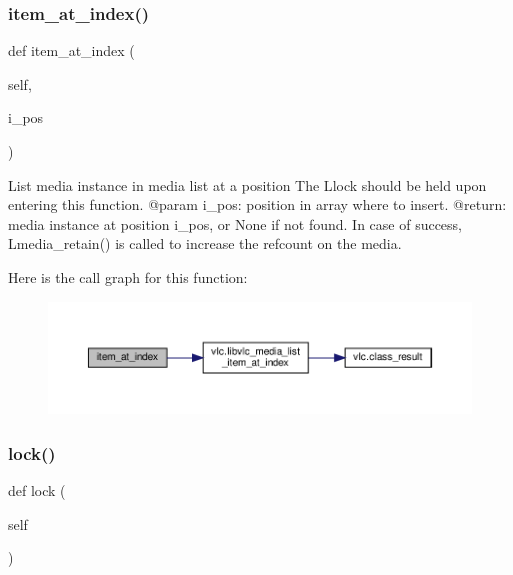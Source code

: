 \subsubsection{\texorpdfstring{item\+\_\+at\+\_\+index()}{item\_at\_index()}}
{\footnotesize\ttfamily def item\+\_\+at\+\_\+index (\begin{DoxyParamCaption}\item[{}]{self,  }\item[{}]{i\+\_\+pos }\end{DoxyParamCaption})}

\begin{DoxyVerb}List media instance in media list at a position
The L{lock} should be held upon entering this function.
@param i_pos: position in array where to insert.
@return: media instance at position i_pos, or None if not found. In case of success, L{media_retain}() is called to increase the refcount on the media.
\end{DoxyVerb}
 Here is the call graph for this function\+:
\nopagebreak
\begin{figure}[H]
\begin{center}
\leavevmode
\includegraphics[width=350pt]{classvlc_1_1_media_list_aea2e5bdf573ff28024234a9fd746edfc_cgraph}
\end{center}
\end{figure}
\mbox{\label{classvlc_1_1_media_list_a8f6a887961a10aa3cbfe3ebed8e644ef}} 
\subsubsection{\texorpdfstring{lock()}{lock()}}
{\footnotesize\ttfamily def lock (\begin{DoxyParamCaption}\item[{}]{self }\end{DoxyParamCaption})}

